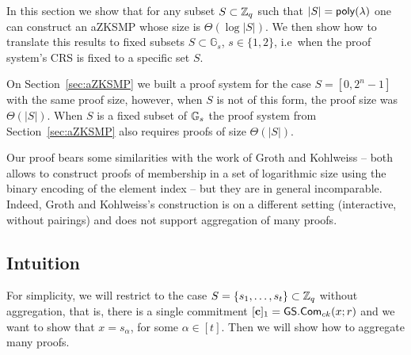 \newcommand{\setsize}{t}

In this section we show that for any subset \(S\subset\mathbb{Z}_q\) such that \(|S|=\mathsf{poly}(\lambda)\) one can construct an aZKSMP whose size is \(\Theta(\log|S|)\). We then show how to translate this results to fixed subsets \(S\subset\mathbb{G}_s\), \(s\in\{1,2\}\), i.e~when the proof system's CRS is fixed to a specific set \(S\).

On Section~\ref{sec:aZKSMP} we built a proof system for the case \(S=[0,2^n-1]\) with the same proof size, however, when \(S\) is not of this form, the proof size was \(\Theta(|S|)\). When \(S\) is a fixed subset of \(\mathbb{G}_s\) the proof system from Section~\ref{sec:aZKSMP} also requires proofs of size \(\Theta(|S|)\).

Our proof bears some similarities with the work of Groth and Kohlweiss \cite{EC:GroKoh15} -- both allows to construct proofs of membership in a set of logarithmic size using the binary encoding of the element index -- but they are in general incomparable. Indeed, Groth and Kohlweiss's construction is on a different setting (interactive, without pairings) and does not support aggregation of many proofs.

\subsection{Intuition}

For simplicity, we will restrict to the case \(S=\{s_1,\ldots,s_\setsize \}\subset\Z_q\) without aggregation, that is, there is a single commitment \([\mathbf{c}]_1={\mathsf{GS}}.\mathsf{Com}_{ck}(x;r)\) and we want to show that \(x=s_\alpha\), for some \(\alpha\in[\setsize ]\). Then we will show how to aggregate many proofs.

